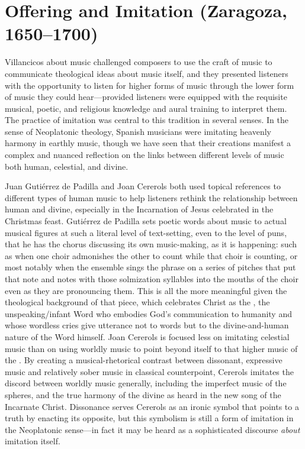 


\chapter{Offering and Imitation (Zaragoza, 1650--1700)}
\label{ch:zaragoza}

Villancicos about music challenged composers to use the craft of music to
communicate theological ideas about music itself, and they presented listeners
with the opportunity to listen for higher forms of music through the lower form
of music they could hear---provided listeners were equipped with the requisite
musical, poetic, and religious knowledge and aural training to interpret them.
The practice of imitation was central to this tradition in several senses. 
In the sense of Neoplatonic theology, Spanish musicians were imitating heavenly
harmony in earthly music, though we have seen that their creations manifest a
complex and nuanced reflection on the links between different levels of music
both human, celestial, and divine.

Juan Gutiérrez de Padilla and Joan Cererols both used topical references to
different types of human music to help listeners rethink the relationship
between human and divine, especially in the Incarnation of Jesus celebrated in
the Christmas feast.
Gutiérrez de Padilla sets poetic words about music to actual musical figures at
such a literal level of text-setting, even to the level of puns, that he has the
chorus discussing its own music-making, as it is happening: such as when one
choir admonishes the other to count while that choir is counting, or most
notably when the ensemble sings the phrase  on a series of
pitches that put that note and notes with those solmization syllables into the
mouths of the choir even as they are pronouncing them.
This is all the more meaningful given the theological background of that piece,
which celebrates Christ as the , the unspeaking/infant Word
who embodies God's communication to humanity and whose wordless cries give
utterance not to words but to the divine-and-human nature of the Word himself.
Joan Cererols is focused less on imitating celestial music than on using worldly
music to point beyond itself to that higher music of the .
By creating a musical-rhetorical contrast between dissonant, expressive music
and relatively sober music in classical counterpoint, Cererols imitates the
discord between worldly music generally, including the imperfect music of the
spheres, and the true harmony of the divine as heard in the new song of the
Incarnate Christ.
Dissonance serves Cererols as an ironic symbol that points to a truth by
enacting its opposite, but this symbolism is still a form of imitation in the
Neoplatonic sense---in fact it may be heard as a sophisticated discourse
\emph{about} imitation itself.


